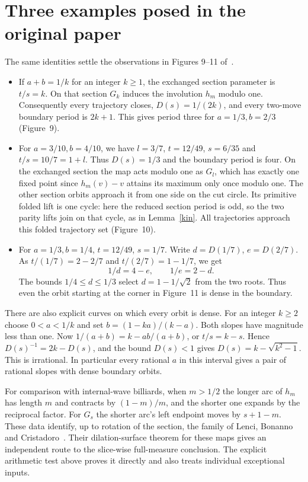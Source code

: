 \documentclass[11pt]{article}
\begin{document}
\section{Three examples posed in the original paper}
The same identities settle the observations in Figures 9--11 of~\cite{hm}.
\begin{itemize}
\item If $a+b=1/k$ for an integer $k\ge1$, the exchanged section parameter is $t/s=k$. On that section $G_k$ induces the involution $h_m$ modulo one. Consequently every trajectory closes, $D(s)=1/(2k)$, and every two-move boundary period is $2k+1$. This gives period three for $a=1/3,b=2/3$ (Figure~9).
\item For $a=3/10,b=4/10$, we have $l=3/7$, $t=12/49$, $s=6/35$ and $t/s=10/7=1+l$. Thus $D(s)=1/3$ and the boundary period is four. On the exchanged section the map acts modulo one as $G_l$, which has exactly one fixed point since $h_m(v)-v$ attains its maximum only once modulo one. The other section orbits approach it from one side on the cut circle. Its primitive folded lift is one cycle: here the reduced section period is odd, so the two parity lifts join on that cycle, as in Lemma~\ref{kin}. All trajectories approach this folded trajectory set (Figure~10).
\item For $a=1/3,b=1/4$, $t=12/49$, $s=1/7$. Write $d=D(1/7)$, $e=D(2/7)$. As $t/(1/7)=2-2/7$ and $t/(2/7)=1-1/7$, we get
\[
 1/d=4-e,\qquad 1/e=2-d.
\]
The bounds $1/4\le d\le1/3$ select $d=1-1/\sqrt2$ from the two roots. Thus even the orbit starting at the corner in Figure~11 is dense in the boundary.
\end{itemize}

There are also explicit curves on which every orbit is dense. For an integer $k\ge2$ choose $0<a<1/k$ and set $b=(1-ka)/(k-a)$. Both slopes have magnitude less than one. Now $1/(a+b)=k-ab/(a+b)$, or $t/s=k-s$. Hence $D(s)^{-1}=2k-D(s)$, and the bound $D(s)<1$ gives $D(s)=k-\sqrt{k^2-1}$. This is irrational. In particular every rational $a$ in this interval gives a pair of rational slopes with dense boundary orbits.

For comparison with internal-wave billiards, when $m>1/2$ the longer arc of $h_m$ has length $m$ and contracts by $(1-m)/m$, and the shorter one expands by the reciprocal factor. For $G_s$ the shorter arc's left endpoint moves by $s+1-m$. These data identify, up to rotation of the section, the family of Lenci, Bonanno and Cristadoro~\cite[Appendix A, (A.2)--(A.4)]{lbc}. Their dilation-surface theorem for these maps gives an independent route to the slice-wise full-measure conclusion. The explicit arithmetic test above proves it directly and also treats individual exceptional inputs.
\end{document}
